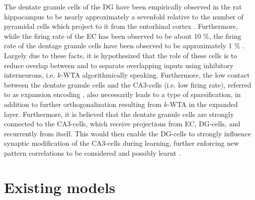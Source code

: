 The dentate granule cells of the DG have been empirically observed in the rat hippocampus to be nearly approximately a sevenfold relative to the number of pyramidal cells which project to it from the entorhinal cortex \citep{Rolls1998chpt6}. Furthermore, while the firing rate of the EC has been observed to be about 10 \%, the firing rate of the dentage granule cells have been observed to be approximately 1 \% \citep{Rolls1998chpt6}.
Largely due to these facts, it is hypothesized that the role of these cells is to reduce overlap between and to separate overlapping inputs using inhibitory interneurons, i.e. $k$-WTA algorithmically speaking. Furthermore, the low contact between the dentate granule cells and the CA3-cells (i.e. low firing rate), referred to as expansion encoding \citep{Rolls1998chpt6}, also necessarily leads to a type of sparsification, in addition to further orthogonalization resulting from $k$-WTA in the expanded layer. Furthermore, it is believed that the dentate granule cells are strongly connected to the CA3-cells, which receive projections from EC, DG-cells, and recurrently from itself. This would then enable the DG-cells to strongly influence synaptic modification of the CA3-cells during learning, further enforcing new pattern correlations to be considered and possibly learnt \citep{Rolls1998chpt6}.

\section{Existing models}\label{chpt:existing-models}

